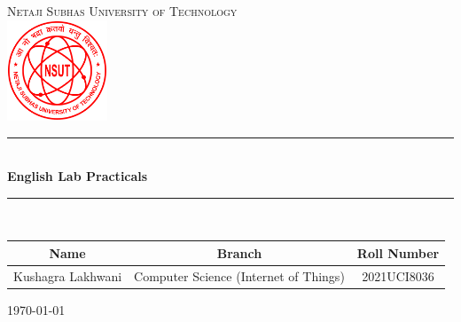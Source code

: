 \documentclass{report}
\begin{document}
\begin{titlepage}

  \newcommand{\HRule}{\rule{\linewidth}{0.5mm}}

  \center
  \textsc{\LARGE Netaji Subhas University of Technology}\\[1.5cm]

  \includegraphics[width=30mm]{NSUT.png}\\[1.0cm]

  \HRule \\[0.7cm]
  { \huge \bfseries English Lab Practicals}\\[0.4cm]
  \HRule \\[3cm]



  \begin{table}[H]
    \centering
    \begin{tabular}{ccc}
      Name              & Branch                                & Roll Number \\
      \hline
      Kushagra Lakhwani & Computer Science (Internet of Things) & 2021UCI8036 \\
    \end{tabular}
  \end{table}


  \vfill
  {\large \today}



\end{titlepage}


\newpage

\tableofcontents

\pagebreak


\newpage






\end{document}
